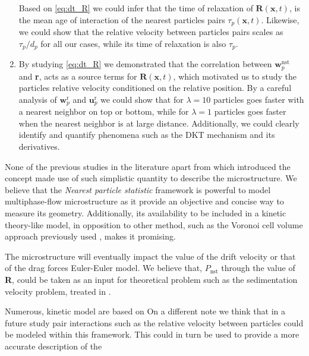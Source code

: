\begin{enumerate}
    Based on \ref{eq:dt_R} we could infer that the time of relaxation of $\textbf{R}(\textbf{x},t)$, is the mean age of interaction of the  nearest particles pairs $\tau_p(\textbf{x},t)$. 
    Likewise, we could show that the relative velocity between particles pairs scales as $\tau_p /d_p$ for all our cases, while its time of relaxation is also $\tau_p$. 
    \item 
    By studying \ref{eq:dt_R} we demonstrated that the correlation between $\textbf{w}_p^\text{nst}$ and \textbf{r}, acts as a source terms for $\textbf{R}(\textbf{x},t)$, which motivated us to study the particles relative velocity conditioned on the relative position. 
    By a careful analysis of $\textbf{w}_p^\text{r}$ and $\textbf{u}_p^\text{r}$ we could show that for $\lambda = 10$ particles goes faster with a nearest neighbor on top or bottom, while for $\lambda = 1$ particles goes faster when the nearest neighbor is at large distance.
    Additionally, we could clearly identify and quantify phenomena such as the DKT mechanism and its derivatives. 
\end{enumerate}
None of the previous studies in the literature apart from \citet{zhang2023evolution} which introduced the concept made use of such simplistic quantity to describe the microstructure. 
We believe that the \textit{Nearest particle statistic} framework is powerful to model multiphase-flow microstructure as it provide an objective and concise way to measure its geometry. 
Additionally, its availability to be included in a kinetic theory-like model, in opposition to other method,  such as the Voronoi cell volume approach previously used \citep{senthil2005voronoi}, makes it promising. 

The microstructure will eventually impact the value of the drift velocity or that of the drag forces Euler-Euler model. 
We believe that,  $P_\text{nst}$ through the value of \textbf{R}, could be taken as an input for theoretical problem such as the sedimentation velocity problem, treated in \citet[Appendix A]{zhang2021ensemble}.
 

Numerous, kinetic model are based on 
On a different note we think that in a future study pair interactions such as the relative velocity between particles could be modeled within this framework. 
This could in turn be used to provide a more accurate description of the 

